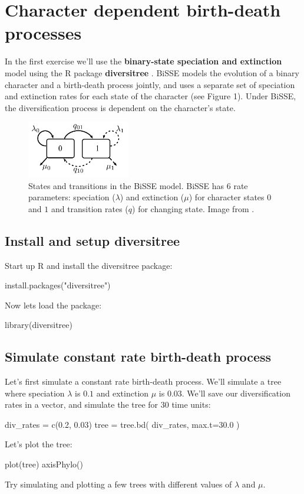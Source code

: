 \documentclass[11pt]{article}
\begin{document}
\section{Character dependent birth-death processes}

In the first exercise we'll use the \textbf{binary-state speciation and extinction} \citep[BiSSE;][]{maddison2007estimating} 
model using the R package \textbf{diversitree} \citep{fitzjohn2012diversitree}.
BiSSE models the evolution of a binary character and a birth-death process jointly,
and uses a separate set of speciation and extinction rates
for each state of the character (see Figure 1).  
Under BiSSE, the diversification process is dependent
on the character's state.

\begin{figure}[H]
\centering
\includegraphics[width=0.4\textwidth]{bisse.png}
\caption{
States and transitions in the BiSSE model. BiSSE has 6 rate parameters:
speciation ($\lambda$) and extinction ($\mu$) for character states $0$ and $1$
and transition rates ($q$) for changing state.
Image from \protect\citet{goldberg2011phylogenetic}.}
\end{figure}



\subsection{Install and setup diversitree}

Start up R and install the diversitree package:
\begin{code}
install.packages("diversitree")
\end{code}
Now lets load the package:
\begin{code}
library(diversitree)
\end{code}

\subsection{Simulate constant rate birth-death process}

Let's first simulate a constant rate birth-death process.
We'll simulate a tree where speciation $\lambda$ is $0.1$
and extinction $\mu$ is $0.03$.
We'll save our diversification rates in a vector, and simulate the tree
for 30 time units:
\begin{code}
div_rates = c(0.2, 0.03)
tree = tree.bd( div_rates, max.t=30.0 )
\end{code}
Let's plot the tree:
\begin{code}
plot(tree)
axisPhylo()
\end{code}
Try simulating and plotting a few trees with different
values of $\lambda$ and $\mu$.
\end{document}
